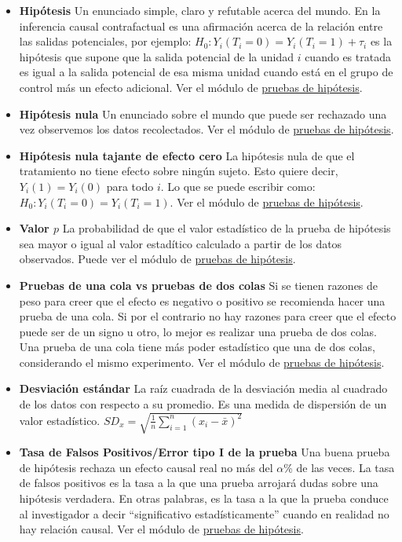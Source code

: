 \documentclass[12pt,spanish,]{book}
\providecommand{\tightlist}{%
  \setlength{\itemsep}{0pt}\setlength{\parskip}{0pt}}
\begin{document}
\begin{itemize}
\tightlist
\item
  \textbf{Hipótesis} Un enunciado simple, claro y refutable acerca del mundo. En la inferencia causal contrafactual es una afirmación acerca de la relación entre las salidas potenciales, por ejemplo: \(H_0: Y_i(T_i=0) = Y_i(T_i=1) + \tau_i\) es la hipótesis que supone que la salida potencial de la unidad \(i\) cuando es tratada es igual a la
  salida potencial de esa misma unidad cuando está en el grupo de control más un efecto adicional. Ver el módulo de \href{pruebas-de-hipótesis.html}{pruebas de hipótesis}.
\item
  \textbf{Hipótesis nula} Un enunciado sobre el mundo que puede ser rechazado una vez observemos los datos recolectados. Ver el módulo de \href{pruebas-de-hipótesis.html}{pruebas de hipótesis}.
\item
  \textbf{Hipótesis nula tajante de efecto cero} La hipótesis nula de que el tratamiento no tiene efecto sobre ningún sujeto. Esto quiere decir, \(Y_i(1)=Y_i(0)\) para todo \(i\). Lo que se puede escribir como: \(H_0: Y_i(T_i=0) = Y_i(T_i=1)\). Ver el módulo de
  \href{pruebas-de-hipótesis.html}{pruebas de hipótesis}.
\item
  \textbf{Valor \(p\)} La probabilidad de que el valor estadístico de la prueba de hipótesis sea mayor o igual al valor estadítico calculado a partir de los datos observados. Puede ver el módulo de \href{pruebas-de-hipótesis.html}{pruebas de hipótesis}.
\item
  \textbf{Pruebas de una cola vs pruebas de dos colas} Si se tienen razones de peso para creer que el efecto es negativo o positivo se recomienda hacer una prueba de una cola.
  Si por el contrario no hay razones para creer que el efecto puede ser de un signo u otro, lo mejor es realizar una prueba de dos colas. Una prueba de una cola tiene más poder estadístico que una de dos colas, considerando el mismo experimento.
  Ver el módulo de \href{pruebas-de-hipótesis.html}{pruebas de hipótesis}.
\item
  \textbf{Desviación estándar} La raíz cuadrada de la desviación media al cuadrado de los datos con respecto a su promedio. Es una medida de dispersión de un valor estadístico.
  \(SD_x=\sqrt{\frac{1}{n}\sum_{i=1}^n(x_i-\bar{x})^2}\)
\item
  \textbf{Tasa de Falsos Positivos/Error tipo I de la prueba} Una buena prueba de hipótesis rechaza un efecto causal real no más del \(\alpha\)\% de las veces. La tasa de falsos positivos es la tasa a la que una prueba arrojará dudas sobre una hipótesis verdadera. En otras palabras, es la tasa a la que la prueba conduce al investigador a decir ``significativo estadísticamente'' cuando en realidad no hay relación causal. Ver el módulo de \href{pruebas-de-hipótesis.html}{pruebas de hipótesis}.

\end{itemize}
\end{document}
